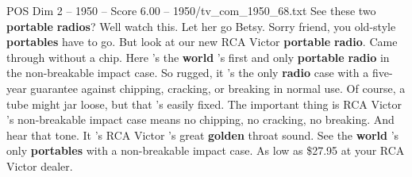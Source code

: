 \begin{textsample}{POS Dim 2 – 1950 – Score 6.00 – 1950/tv\_com\_1950\_68.txt}  \label{ex:f2_pos_004}
See these two \textbf{portable} \textbf{radios}?
Well watch this.
Let her go Betsy.
Sorry friend, you old-style \textbf{portables} have to go.
But look at our new RCA Victor \textbf{portable} \textbf{radio}.
Came through without a chip.
Here 's the \textbf{world} 's first and only \textbf{portable} \textbf{radio} in the non-breakable impact case.
So rugged, it 's the only \textbf{radio} case with a five-year guarantee against chipping, cracking, or breaking in normal use.
Of course, a tube might jar loose, but that 's easily fixed.
The important thing is RCA Victor 's non-breakable impact case means no chipping, no cracking, no breaking.
And hear that tone.
It 's RCA Victor 's great \textbf{golden} throat sound.
See the \textbf{world} 's only \textbf{portables} with a non-breakable impact case.
As low as \$27.95 at your RCA Victor dealer.

\end{textsample}
